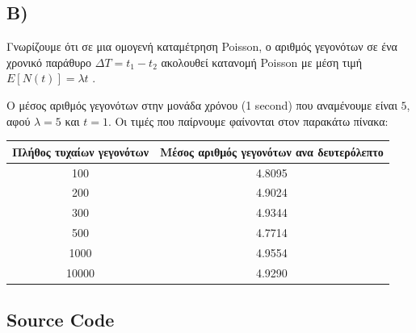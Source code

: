 \documentclass{article}
\newcommand{\english}[1]{\foreignlanguage{english}{{#1}}}
\begin{document}
\subsection*{B)}

Γνωρίζουμε ότι σε μια ομογενή καταμέτρηση \english{Poisson}, ο αριθμός γεγονότων σε ένα χρονικό παράθυρο $ΔT = t_1 - t_2$ ακολουθεί κατανομή \english{Poisson} με μέση τιμή $E[N(t)] = λt$ \cite{exponential_and_poisson_proc}.

Ο μέσος αριθμός γεγονότων στην μονάδα χρόνου (1 \english{second}) που αναμένουμε είναι $5$, αφού $λ = 5$ και $t = 1$. Οι τιμές που παίρνουμε φαίνονται στον παρακάτω πίνακα:

\begin{center}
    \begin{tabular}{ |c|c| } 
     \hline
     Πλήθος τυχαίων γεγονότων & Μέσος αριθμός γεγονότων ανα δευτερόλεπτο  \\ 
     \hline
     100 & 4.8095  \\ 
     \hline
     200 & 4.9024  \\ 
     \hline
     300 & 4.9344  \\ 
     \hline
     500 & 4.7714  \\
     1000 & 4.9554  \\ 
     \hline
     10000 & 4.9290  \\  
     \hline
    \end{tabular}
\end{center}

\begin{otherlanguage}{english}
    \printbibliography


\section*{Source Code}

\end{otherlanguage}
\end{document}

